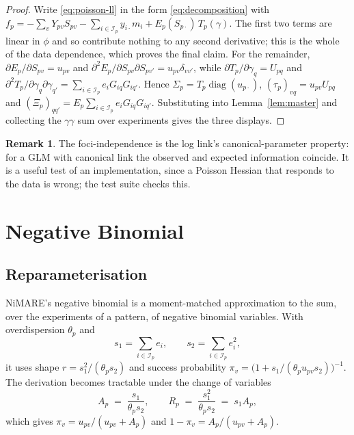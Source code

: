 \documentclass[11pt,a4paper]{article}
\theoremstyle{plain}
\theoremstyle{definition}
\newtheorem{remark}[proposition]{Remark}
\newcommand{\E}{\mathcal{I}}
\newcommand{\diag}{\operatorname{diag}}
\begin{document}
\begin{proof}
Write \eqref{eq:poisson-ll} in the form \eqref{eq:decomposition} with
$f_p = -\sum_v Y_{pv}S_{pv} - \sum_{i\in\E_p} y_{i\cdot}m_i + E_p(S_{p\cdot})\,T_p(\gamma)$.
The first two terms are linear in $\phi$ and so contribute nothing to any second derivative;
this is the whole of the data dependence, which proves the final claim. For the remainder,
$\partial E_p/\partial S_{pv} = u_{pv}$ and $\partial^2 E_p/\partial S_{pv}\partial S_{pv'} =
u_{pv}\delta_{vv'}$, while $\partial T_p/\partial\gamma_q = U_{pq}$ and
$\partial^2 T_p / \partial\gamma_q\partial\gamma_{q'} = \sum_{i\in\E_p} e_i G_{iq}G_{iq'}$.
Hence $\Sigma_p = T_p \diag(u_{p\cdot})$, $(\tau_p)_{vq} = u_{pv}U_{pq}$ and
$(\Xi_p)_{qq'} = E_p \sum_{i \in \E_p} e_iG_{iq}G_{iq'}$. Substituting into
Lemma~\ref{lem:master} and collecting the $\gamma\gamma$ sum over experiments gives the three
displays.
\end{proof}

\begin{remark}
The foci-independence is the log link's canonical-parameter property: for a GLM with canonical
link the observed and expected information coincide. It is a useful test of an implementation,
since a Poisson Hessian that responds to the data is wrong; the test suite checks this.
\end{remark}

\section{Negative Binomial}

\subsection{Reparameterisation}

NiMARE's negative binomial is a moment-matched approximation to the sum, over the experiments of
a pattern, of negative binomial variables. With overdispersion $\theta_p$ and
\begin{equation}
  s_{1} = \sum_{i\in\E_p} e_i, \qquad s_{2} = \sum_{i\in\E_p} e_i^2 ,
\end{equation}
it uses shape $r = s_1^2/(\theta_p s_2)$ and success probability
$\pi_v = \bigl(1 + s_1/(\theta_p u_{pv} s_2)\bigr)^{-1}$. The derivation becomes tractable under
the change of variables
\begin{equation}\label{eq:nb-RA}
  A_p \;=\; \frac{s_1}{\theta_p s_2}, \qquad R_p \;=\; \frac{s_1^2}{\theta_p s_2} \;=\; s_1 A_p ,
\end{equation}
which gives $\pi_v = u_{pv}/(u_{pv}+A_p)$ and $1-\pi_v = A_p/(u_{pv}+A_p)$.
\end{document}
